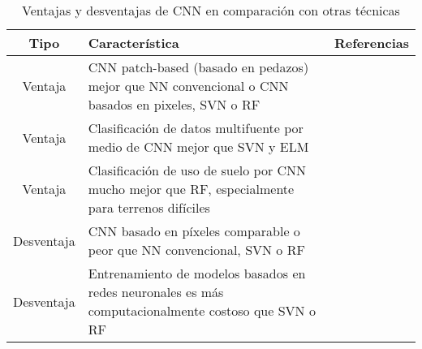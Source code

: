 \begin{center}
    \vspace{-\topsep}
    \begin{table}[h!]
        \begin{tabular}{ |c|m{11cm}|c| }
            \hline
            \bf Tipo & \bf Característica & \bf Referencias \\
            \hline
            Ventaja & CNN patch-based (basado en pedazos) mejor que NN convencional o CNN basados en pixeles, SVN o RF
                    & \autocite{sharma-2017} \\
            \hline
            Ventaja & Clasificación de datos multifuente por medio de CNN mejor que SVN y ELM & \autocite{xu-2017} \\
            \hline
            Ventaja & Clasificación de uso de suelo por CNN mucho mejor que RF, especialmente para terrenos difíciles &
            \autocite{rezaee-2018} \\
            \hline
            Desventaja & CNN basado en píxeles comparable o peor que NN convencional, SVN o RF & \autocite{sharma-2017}
            \\
            \hline
            Desventaja & Entrenamiento de modelos basados en redes neuronales es más computacionalmente costoso que SVN
            o RF & \autocite{sharma-2017,xu-2017,rezaee-2018} \\
            \hline
        \end{tabular}
        \caption{Ventajas y desventajas de CNN en comparación con otras técnicas}
        \label{table:2}
    \end{table}
    \vspace{-\topsep}
\end{center}

